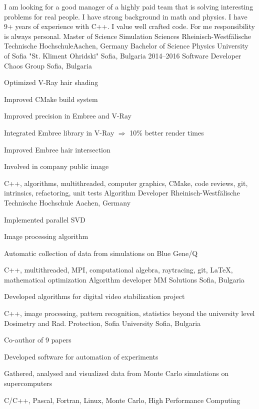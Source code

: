I am looking for a good manager of a highly paid team that is solving
interesting problems for real people. I have strong background in math
and physics. I have 9+ years of experience with C++. I value well
crafted code. For me responsibility is always personal.
{Master of Science}
{Simulation Sciences}
{Rheinisch-Westfälische Technische Hochschule}{Aachen, Germany}
{Bachelor of Science}
{Physics}
{University of Sofia "St. Kliment Ohridski"}
{Sofia, Bulgaria}
\myjobb
{2014--2016}
{Software Developer}
{Chaos Group}
{Sofia, Bulgaria}
{
\item Optimized V-Ray hair shading
\item Improved CMake build system 
\item Improved precision in Embree and V-Ray
}
{
\item Integrated Embree library in V-Ray $\Rightarrow$ 10\% better render times 
\item Improved Embree hair intersection 
\item Involved in company public image
}
{C++, algorithms, multithreaded, computer graphics, CMake, code reviews, git, intrinsics, refactoring, unit tests}
{Algorithm Developer}
{Rheinisch-Westfälische Technische Hochschule}
{Aachen, Germany}
{
 \item Implemented parallel SVD
 \item Image processing algorithm
}
{
\item Automatic collection of data from simulations on Blue Gene/Q
}
{C++, multithreaded, MPI, computational algebra, raytracing, git, \LaTeX, mathematical optimization}
{Algorithm developer}
{MM Solutions}
{Sofia, Bulgaria}
{ \item Developed algorithms for digital video stabilization project}
{C++, image processing, pattern recognition, statistics beyond the university level}
{Dosimetry and Rad. Protection, Sofia University} {Sofia, Bulgaria}
{
 \item Co-author of 9 papers
 \item Developed software for automation of experiments
}
{ 
 \item Gathered, analysed and visualized data from Monte Carlo simulations on supercomputers
}
{C/C++, Pascal, Fortran, Linux, Monte Carlo, High Performance Computing}
